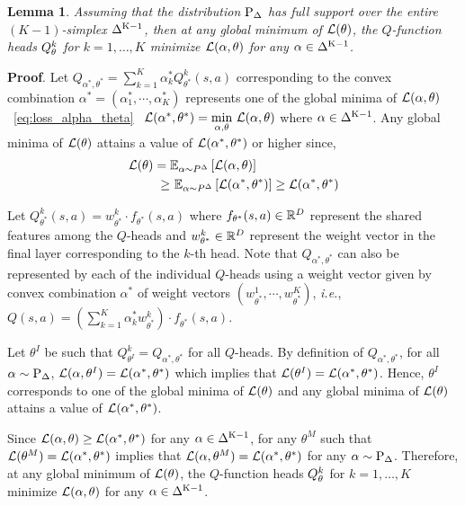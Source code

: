 \textbf{Lemma 1}. {\it Assuming that the distribution ${\textnormal{P}}_{\Delta}$ has full support
over the entire $(K-1)$-simplex $\Delta^{{\textnormal{K}} - 1}$, then
at any global minimum of $\mathcal{L}({\theta})$, the $Q$-function heads $Q_{\theta}^{k}$ for $k=1,\dots,K$ minimize
$\mathcal{L}(\alpha, \theta)$ for any $\alpha \in \Delta^{{\textnormal{K}} - 1}$.}

\textbf{Proof}. Let $Q_{\alpha^{*}, \theta^{*}} =\sum_{k=1}^{K} \alpha^{*}_{k} Q^{k}_{\theta^{*}}(s, a)$
corresponding to the convex combination $\alpha^{*} = (\alpha^{*}_1, \cdots, \alpha^{*}_K)$
represents one of the global minima of
$\mathcal{L}(\alpha, \theta)$~\eqref{eq:loss_alpha_theta} \ie\
$\mathcal{L}(\alpha^{*}, \theta^{*}) = \underset{\alpha, \theta}{\text{min}}\ \mathcal{L}(\alpha, \theta)$ where
$\alpha \in \Delta^{{\textnormal{K}} - 1}$.
Any global minima of $\mathcal{L}(\theta)$ attains a value of $\mathcal{L}(\alpha^{*}, \theta^{*})$ or higher since,
\begin{align}
\mathcal{L}(\theta) ={}& \mathbb{E}_{\alpha \sim P^{\Delta}} \left[\mathcal{L}(\alpha, \theta)\right]\\ \nonumber
\ge&~ \mathbb{E}_{\alpha \sim P^{\Delta}} \left[\mathcal{L}(\alpha^{*}, \theta^{*})\right]
\ge \mathcal{L}(\alpha^{*}, \theta^{*}) \nonumber
\end{align}

Let $Q^{k}_{\theta^{*}}(s,a) = w^{k}_{\theta^{*}} \cdot f_{\theta^{*}}(s,a)$ where
$f_{\theta^{*}}(s, a) \in \mathbb{R}^{D}$ represent the shared features among the $Q$-heads
and $w^{k}_{\theta^{*}} \in \mathbb{R}^{D}$ represent the weight vector in
the final layer corresponding to the $k$-th head. Note that $Q_{\alpha^{*}, \theta^{*}}$ can also
be represented by each of the individual $Q$-heads using a weight vector given by
convex combination $\alpha^{*}$ of weight vectors $(w^{1}_{\theta^{*}}, \cdots, w^{K}_{\theta^{*}})$, \textit{i.e.},
$Q(s, a) = \left(\sum_{k=1}^{K} \alpha^{*}_{k} w^{k}_{\theta^{*}}\right) \cdot f_{\theta^{*}}(s,a)$.

Let $\theta^{I}$ be such that
$Q^{k}_{\theta^{I}} = Q_{\alpha^{*}, \theta^{*}}$ for all $Q$-heads.
By definition of $Q_{\alpha^{*}, \theta^{*}}$, for all $\alpha \sim {\textnormal{P}}_{\Delta}$,
$\mathcal{L}(\alpha, \theta^{I}) = \mathcal{L}(\alpha^{*}, \theta^{*})$
which implies that $\mathcal{L}(\theta^{I}) = \mathcal{L}(\alpha^{*}, \theta^{*})$.
Hence, $\theta^{I}$ corresponds to one of the global minima of $\mathcal{L}(\theta)$ and
any global minima of $\mathcal{L}(\theta)$ attains a value of $\mathcal{L}(\alpha^{*}, \theta^{*})$.

Since $\mathcal{L}(\alpha, \theta) \ge \mathcal{L}(\alpha^{*}, \theta^{*})$ for any $\alpha \in \Delta^{{\textnormal{K}} - 1}$,
for any $\theta^{M}$ such that $\mathcal{L}(\theta^{M}) = \mathcal{L}(\alpha^{*}, \theta^{*})$ implies
that $\mathcal{L}(\alpha, \theta^{M}) = \mathcal{L}(\alpha^{*}, \theta^{*})$ for any $\alpha \sim {\textnormal{P}}_{\Delta}$. Therefore,
at any global minimum of $\mathcal{L}({\theta})$, the $Q$-function heads $Q_{\theta}^{k}$ for $k=1,\dots,K$ minimize
$\mathcal{L}(\alpha, \theta)$ for any $\alpha \in \Delta^{{\textnormal{K}} - 1}$.

